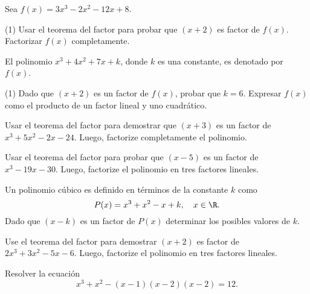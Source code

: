 \begin{multicols}{2}
    \begin{exercise}
        Sea $f(x) = 3x^3 - 2x^2 - 12x + 8$.
        \begin{tasks}[label=\alph*.](1)
            \task Usar el teorema del factor para probar que $(x + 2)$ es factor de $f(x)$.
            \task Factorizar $f(x)$ completamente.
        \end{tasks}
    \end{exercise}

    \begin{exercise}
        El polinomio $x^3 + 4x^2 + 7x + k$, donde $k$ es una constante, es denotado por $f(x)$.
        \begin{tasks}[label=\alph*.](1)
            \task Dado que $(x + 2)$ es un factor de $f(x)$, probar que $k = 6$.
            \task Expresar $f(x)$ como el producto de un factor lineal y uno cuadrático.
        \end{tasks}
    \end{exercise}

    \begin{exercise}
        Usar el teorema del factor para demostrar que $(x + 3)$ es un factor de $x^3 + 5x^2 - 2x - 24$.
        Luego, factorize completamente el polinomio.
    \end{exercise}

    \begin{exercise}
        Usar el teorema del factor para probar que $(x - 5)$ es un factor de $x^3 - 19x - 30$.
        Luego, factorize el polinomio en tres factores lineales.
    \end{exercise}

    \begin{exercise}
        Un polinomio cúbico es definido en términos de la constante $k$ como
        \[
            P(x) = x^3 + x^2 - x + k,\quad x \in \R.
        \]
        Dado que $(x - k)$ es un factor de $P(x)$ determinar los posibles valores de $k$.
    \end{exercise}

    \begin{exercise}
        Use el teorema del factor para demostrar $(x + 2)$ es factor de $2x^3 + 3x^2 - 5x - 6$.
        Luego, factorize el polinomio en tres factores lineales.
    \end{exercise}

    \begin{exercise}
        Resolver la ecuación
        \[
            x^3 + x^2 - (x - 1)(x - 2)(x - 2) = 12.
        \]
    \end{exercise}


\end{multicols}
